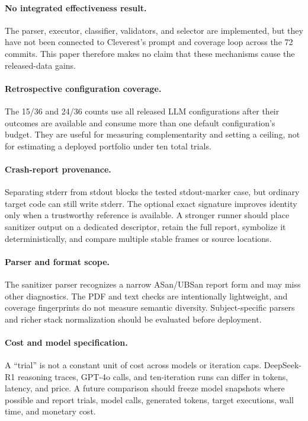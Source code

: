 \documentclass{article}
\begin{document}
\paragraph{No integrated effectiveness result.}
The parser, executor, classifier, validators, and selector are implemented, but
they have not been connected to Cleverest's prompt and coverage loop across the
72 commits.  This paper therefore makes no claim that these mechanisms cause
the released-data gains.

\paragraph{Retrospective configuration coverage.}
The 15/36 and 24/36 counts use all released LLM configurations after their
outcomes are available and consume more than one default configuration's
budget.  They are useful for measuring complementarity and setting a ceiling,
not for estimating a deployed portfolio under ten total trials.

\paragraph{Crash-report provenance.}
Separating stderr from stdout blocks the tested stdout-marker case, but ordinary
target code can still write stderr.  The optional exact signature improves
identity only when a trustworthy reference is available.  A stronger runner
should place sanitizer output on a dedicated descriptor, retain the full
report, symbolize it deterministically, and compare multiple stable frames or
source locations.

\paragraph{Parser and format scope.}
The sanitizer parser recognizes a narrow ASan/UBSan report form and may miss
other diagnostics.  The PDF and text checks are intentionally lightweight, and
coverage fingerprints do not measure semantic diversity.  Subject-specific
parsers and richer stack normalization should be evaluated before deployment.

\paragraph{Cost and model specification.}
A ``trial'' is not a constant unit of cost across models or iteration caps.
DeepSeek-R1 reasoning traces, GPT-4o calls, and ten-iteration runs can differ in
tokens, latency, and price.  A future comparison should freeze model snapshots
where possible and report trials, model calls, generated tokens, target
executions, wall time, and monetary cost.
\end{document}
